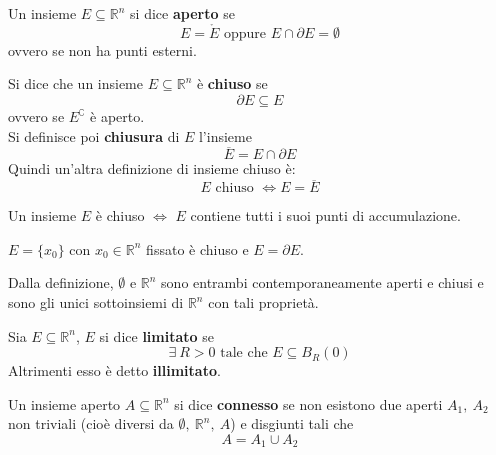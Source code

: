 \begin{definition}
    Un insieme $E \subseteq \mathbb{R}^n$ si dice \textbf{aperto} se
    \begin{equation}
        E=\mathring{E} \text{ oppure } E \cap \partial{E} = \emptyset
    \end{equation}
    ovvero se non ha punti esterni.
\end{definition}
\begin{definition} \label{Def: Insieme chiuso e chiusura}
    Si dice che un insieme $E \subseteq \mathbb{R}^n$ è \textbf{chiuso} se 
    \begin{equation}
        \partial{E} \subseteq E
    \end{equation}
    ovvero se $E^\complement$ è aperto.\\
    Si definisce poi \textbf{chiusura} di $E$ l'insieme
    \begin{equation}
        \overline{E} = E \cap \partial{E}
    \end{equation}
    Quindi un'altra definizione di insieme chiuso è:
    \begin{equation}
        E \text{ chiuso } \iff E=\overline{E}
    \end{equation}
\end{definition}
\begin{proposition}
    Un insieme $E$ è chiuso $\iff$ $E$ contiene tutti i suoi punti di accumulazione.
\end{proposition}
\begin{oss}
    $E=\{x_0\}$ con $x_0 \in \mathbb{R}^n$ fissato è chiuso e $E=\partial{E}$.
\end{oss}
\begin{oss}
    Dalla definizione, $\emptyset$ e $\mathbb{R}^n$ sono entrambi contemporaneamente aperti e chiusi e sono gli unici sottoinsiemi di $\mathbb{R}^n$ con tali proprietà.
\end{oss}
\begin{definition}
    Sia $E \subseteq \mathbb{R}^n$, $E$ si dice \textbf{limitato} se
    \begin{equation}
        \exists\ R>0 \text{ tale che } E \subseteq B_R(0)
    \end{equation}
    Altrimenti esso è detto \textbf{illimitato}.
\end{definition}
\begin{definition}
    Un insieme aperto $A\subseteq \mathbb{R}^n$ si dice \textbf{connesso} se non esistono due aperti $A_1, \ A_2$ non triviali (cioè diversi da $\emptyset,\ \mathbb{R}^n,\ A$) e disgiunti tali che
    \begin{equation}
        A=A_1 \cup A_2
    \end{equation}
\end{definition}
